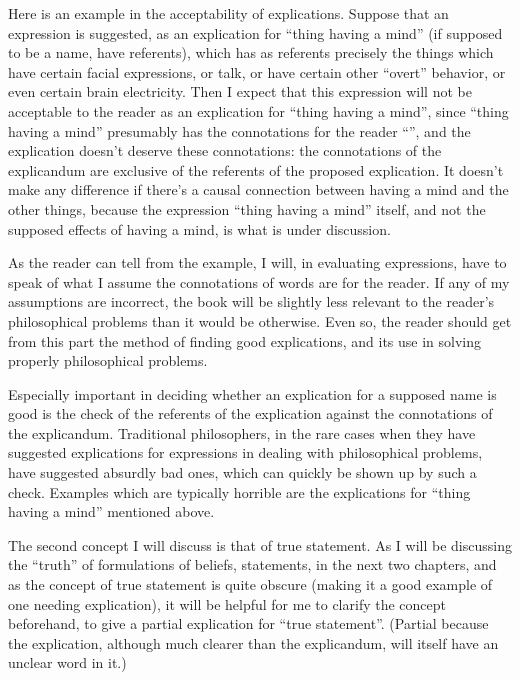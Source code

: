 Here is an example in the acceptability of explications. Suppose that an expression is suggested, as an explication for \enquote{thing having a mind} (if supposed to be a name, have referents), which has as referents precisely the things which have certain facial expressions, or talk, or have certain other \enquote{overt} behavior, or even certain brain electricity. Then I expect that this expression will not be acceptable to the reader as an explication for \enquote{thing having a mind}, since \enquote{thing having a mind} presumably has the connotations for the reader \enquote{}, and the explication doesn't deserve these connotations: the connotations of the explicandum are exclusive of the referents of the proposed explication. It doesn't make any difference if there's a causal connection between having a mind and the other things, because the expression \enquote{thing having a mind} itself, and not the supposed effects of having a mind, is what is under discussion. 

As the reader can tell from the example, I will, in evaluating expressions, have to speak of what I assume the connotations of words are for the reader. If any of my assumptions are incorrect, the book will be slightly less relevant to the reader's philosophical problems than it would be otherwise. Even so, the reader should get from this part the method of finding good explications, and its use in solving properly philosophical problems. 

Especially important in deciding whether an explication for a supposed name is good is the check of the referents of the explication against the connotations of the explicandum. Traditional philosophers, in the rare cases when they have suggested explications for expressions in dealing with philosophical problems, have suggested absurdly bad ones, which can quickly be shown up by such a check. Examples which are typically horrible are the explications for \enquote{thing having a mind} mentioned above. 

The second concept I will discuss is that of true statement. As I will be discussing the \enquote{truth} of formulations of beliefs, statements, in the next two chapters, and as the concept of true statement is quite obscure (making it a good example of one needing explication), it will be helpful for me to clarify the concept beforehand, to give a partial explication for \enquote{true statement}. (Partial because the explication, although much clearer than the explicandum, will itself have an unclear word in it.) 


